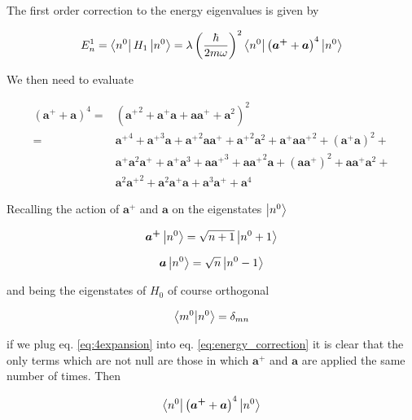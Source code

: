 \documentclass{article}
\begin{document}
The first order correction to the energy eigenvalues is given by

\begin{equation}
\label{eq:energy_correction}
E_n^1 = \bra{n^0} H_1 \ket{n^0} = \lambda \left( \frac{\hbar}{2m \omega} \right)^2 \bra{n^0} \left( \bm{a^+} + \bm{a} \right)^4 \ket{n^0}
\end{equation}

We then need to evaluate

\begin{align}
\label{eq:4expansion}
\left( \bm{a^+} + \bm{a} \right)^4 = & \left( {\bm{a^+}}^2 + \bm{a^+} \bm{a} + \bm{a} \bm{a^+} + \bm{a}^2 \right)^2 \nonumber \\
= & {\bm{a^+}}^4 + {\bm{a^+}}^3 \bm{a} + {\bm{a^+}}^2 \bm{a} \bm{a^+} + {\bm{a^+}}^2 \bm{a}^2 + \bm{a^+} \bm{a} {\bm{a^+}}^2 + (\bm{a^+}\bm{a})^2 + \nonumber \\ 
& \bm{a^+}\bm{a}^2\bm{a^+} + \bm{a^+} \bm{a}^3 + \bm{a} {\bm{a^+}}^3 + \bm{a} {\bm{a^+}}^2 \bm{a} + (\bm{a} \bm{a^+})^2 + \bm{a} \bm{a^+} \bm{a}^2 + \nonumber \\
& \bm{a}^2 {\bm{a^+}}^2 + \bm{a}^2 \bm{a^+} \bm{a} + \bm{a}^3 \bm{a^+} + \bm{a}^4
\end{align}

Recalling the action of \( \bm{a^+} \) and \( \bm{a} \) on the eigenstates \( \ket{n^0} \)

\begin{equation}
\bm{a^+} \ket{n^0} = \sqrt{n + 1} \ket{n^0 + 1}
\end{equation}

\begin{equation}
\bm{a} \ket{n^0} = \sqrt{n} \ket{n^0 - 1}
\end{equation}

and being the eigenstates of \( H_0 \) of course orthogonal

\begin{equation}
\braket{m^0}{n^0} = \delta_{mn}
\end{equation}

if we plug eq. \eqref{eq:4expansion} into eq. \eqref{eq:energy_correction} it is clear that the only terms which are not null are those in which \( \bm{a^+} \) and \(\bm{a} \) are applied the same number of times. Then

\begin{equation}
\label{eq:a_sandwich}
\bra{n^0} \left( \bm{a^+} + \bm{a} \right)^4 \ket{n^0}
\end{equation}
\end{document}
